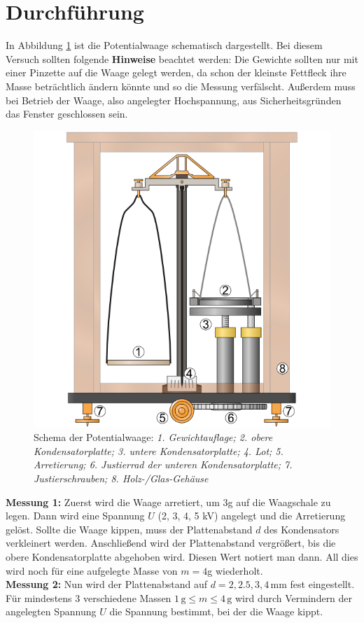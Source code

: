 \documentclass[12pt,a4paper,titlepage,headinclude,bibtotoc]{scrartcl}
\begin{document}
\section{Durchführung}
\label{sec:durchfuehrung}
In Abbildung \ref{fig:PotWaageSchema} ist die Potentialwaage schematisch dargestellt.
Bei diesem Versuch sollten folgende \textbf{Hinweise} beachtet werden:
Die Gewichte sollten nur mit einer Pinzette auf die Waage gelegt werden, da schon der kleinste Fettfleck ihre Masse beträchtlich ändern könnte und so die Messung verfälscht.
Außerdem muss bei Betrieb der Waage, also angelegter Hochspannung, aus Sicherheitsgründen das Fenster geschlossen sein.\\
\begin{figure}[!htb]
	\centering	
	\includegraphics[scale=0.7]{PotWaageSchema.png}
	\caption{Schema der Potentialwaage: \small{\emph{1. Gewichtauflage; 2. obere Kondensatorplatte; 3. untere Kondensatorplatte; 4. Lot; 5. Arretierung; 6. Justierrad der unteren Kondensatorplatte; 7. Justierschrauben; 8. Holz-/Glas-Gehäuse}} \cite[abgerufen am 06.09.2014]{LP10}}
	\label{fig:PotWaageSchema}
\end{figure}

\textbf{Messung 1:}
Zuerst wird die Waage arretiert, um 3g auf die Waagschale zu legen.
Dann wird eine Spannung $U$ (2, 3, 4, 5 kV) angelegt und die Arretierung gelöst.
Sollte die Waage kippen, muss der Plattenabstand $d$ des Kondensators verkleinert werden.
Anschließend wird der Plattenabstand vergrößert, bis die obere Kondensatorplatte abgehoben wird.
Diesen Wert notiert man dann.
All dies wird noch für eine aufgelegte Masse von $m=4$g wiederholt.\\  
\textbf{Messung 2:}
Nun wird der Plattenabstand auf $d=2, 2.5, 3, 4\,$mm fest eingestellt.
Für mindestens 3 verschiedene Massen $1\,\text{g}\leq m \leq 4\,\text{g}$ wird durch Vermindern der angelegten Spannung $U$ die Spannung bestimmt, bei der die Waage kippt.
\end{document}
